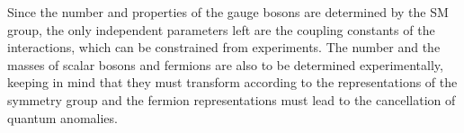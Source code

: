 Since the number and properties of the gauge bosons are determined by the SM group, %
the only independent parameters left are the coupling constants of the interactions, which can be constrained from experiments.
The number and the masses of scalar bosons and fermions are also to be determined experimentally, %
keeping in mind that they must transform according to the representations of the symmetry group %
and the fermion representations must lead to the cancellation of quantum anomalies.


